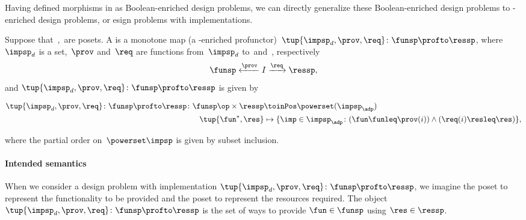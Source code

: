{    Having defined morphisms in \DP as Boolean-enriched design problems, we can directly generalize these Boolean-enriched design problems to \Set-enriched design problems, or esign problems with implementations.

    \begin{definition}
        \label{def:dpwithimp}
        Suppose that~\funsp,~\ressp are posets.
        A \emph{} is a monotone map (a \Set-enriched profunctor)~$\tup{\impsp_d,\prov,\req}\colon \funsp\profto \ressp$, where~$\impsp_d$ is a set,~$\prov$ and~$\req$ are functions from~$\impsp_d$ to~\funsp and~\ressp, respectively
        \begin{equation*}
            \funsp \xleftarrow{\prov} I \xrightarrow{\req} \ressp,
        \end{equation*}
        and $\tup{\impsp_d,\prov,\req}\colon \funsp\profto \ressp$ is given by

        \begin{widepar}
            \begin{equation}
                \begin{aligned}
                    \tup{\impsp_d,\prov,\req}\colon \funsp\profto \ressp \colon \funsp\op \times \ressp & \toinPos \powerset(\impsp_\adp)                                                                   \\
                    \tup{\fun^*, \res}                                                                  & \mapsto \{ \imp \in \impsp_\adp \colon ( \fun \funleq \prov(i)) \wedge (\req(i) \resleq \res) \}, 
                \end{aligned}
            \end{equation}
        \end{widepar}

        where the partial order on~$\powerset\impsp$ is given by subset inclusion.
    \end{definition}

    \paragraph{Intended semantics} When we consider a design problem with implementation $\tup{\impsp_d, \prov, \req}\colon \funsp\profto \ressp$, we imagine the poset \funsp to represent the functionality to be provided and the poset \ressp to represent the resources required.
    The object $\tup{\impsp_d,\prov,\req}\colon \funsp\profto \ressp$ is the set of ways to provide $\fun\in \funsp$ using $\res\in \ressp$.

}
